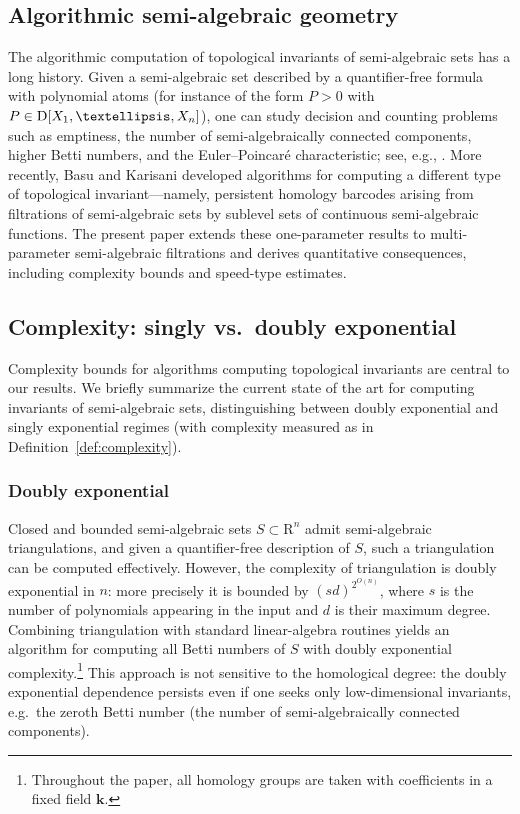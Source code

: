 \documentclass{amsart}[10pts]
\theoremstyle{definition}
\theoremstyle{remark}
\theoremstyle{observation}
\numberwithin{equation}{section}
\newcommand {\R} {\mathrm{R}}
\newcommand {\D}     {\mbox{\rm D}}
\newcommand {\kk}         {\mathbf{k}}
\begin{document}
\subsection{Algorithmic semi-algebraic geometry}
The algorithmic computation of topological invariants of semi-algebraic sets has a long history. 
Given a semi-algebraic set described by a quantifier-free formula with polynomial atoms (for instance of the form $P>0$ with $P\in \D[X_1,\ldots,X_n]$), one can study decision and counting problems such as emptiness, the number of semi-algebraically connected components, higher Betti numbers, and the Euler--Poincar\'e characteristic; see, e.g., \cite{SS,BPRbettione,Bas05-first,BCL2019,BCT2020.1,BCT2020.2}. 
More recently, Basu and Karisani \cite{Basu-Karisani-2} developed algorithms for computing a different type of topological invariant---namely, persistent homology barcodes arising from filtrations of semi-algebraic sets by sublevel sets of continuous semi-algebraic functions. 
The present paper extends these one-parameter results to multi-parameter semi-algebraic filtrations and derives quantitative consequences, including complexity bounds and speed-type estimates.

\subsection{Complexity: singly vs.\ doubly exponential}
Complexity bounds for algorithms computing topological invariants are central to our results. 
We briefly summarize the current state of the art for computing invariants of semi-algebraic sets, distinguishing between doubly exponential and singly exponential regimes (with complexity measured as in Definition~\ref{def:complexity}).

\subsubsection{Doubly exponential}
Closed and bounded semi-algebraic sets $S\subset \R^n$ admit semi-algebraic triangulations, and given a quantifier-free description of $S$, such a triangulation can be computed effectively. 
However, the complexity of triangulation is doubly exponential in $n$: more precisely it is bounded by $(sd)^{2^{O(n)}}$, where $s$ is the number of polynomials appearing in the input and $d$ is their maximum degree.
Combining triangulation with standard linear-algebra routines yields an algorithm for computing all Betti numbers of $S$ with doubly exponential complexity.\footnote{Throughout the paper, all homology groups are taken with coefficients in a fixed field $\kk$.}
This approach is not sensitive to the homological degree: the doubly exponential dependence persists even if one seeks only low-dimensional invariants, e.g.\ the zeroth Betti number (the number of semi-algebraically connected components).
\end{document}
